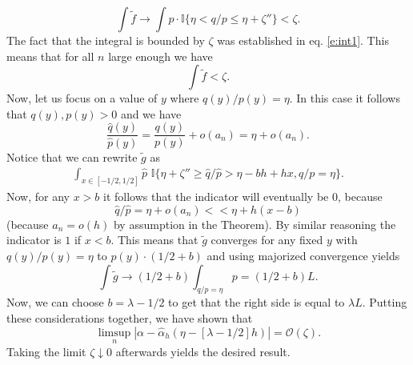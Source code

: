 \[
\int \tilde f \to \int p \cdot \mathbb{I}\{\eta <q/p  \le \eta+\zeta''\} <\zeta.
\]
The fact that the integral is bounded by $\zeta$ was established in eq. \eqref{e:int1}. This means that for all $n$ large enough we have 
\[
\int \tilde f < \zeta.
\]
Now, let us focus on a value of $y$ where $q(y)/p(y)=\eta$. In this case it follows that $q(y), p(y)>0$ and we have 
\[
\frac{\hat q(y)}{\hat p(y)} = \frac{q(y)}{p(y)} +o(a_n) = \eta +o(a_n).
\]
Notice that we can rewrite $\tilde g$ as
\begin{align*}
    \int_{x \in [-1/2,1/2]}  \hat p \,\,\mathbb{I}\{\eta +\zeta'' \ge \hat q /\hat p  > \eta-b h +hx,q/p=\eta\}.
\end{align*}
Now, for any $x>b$ it follows that the indicator will eventually be $0$, because 
\[
\hat q /\hat p =\eta+o(a_n) << \eta + h(x-b)
\]
(because $a_n=o(h)$ by assumption in the Theorem). By similar reasoning the indicator is $1$ if $x<b$. This means that $\tilde g$ converges for any fixed $y$ with $q(y)/p(y)=\eta$ to $p(y) \cdot (1/2+b)$ and using majorized convergence yields
\[
\int \tilde g \to (1/2+b) \int_{q/p=\eta} p =  (1/2+b)L.
\]
Now, we can choose  $b=\lambda-1/2$ to get that the right side is equal to $\lambda L$. Putting these considerations together, we have shown that
\[
\limsup_n |\alpha -\hat \alpha_h(\eta-[\lambda-1/2] h)| = \mathcal{O}(\zeta). 
\]
Taking the limit $\zeta \downarrow 0$ afterwards yields the desired result. 
